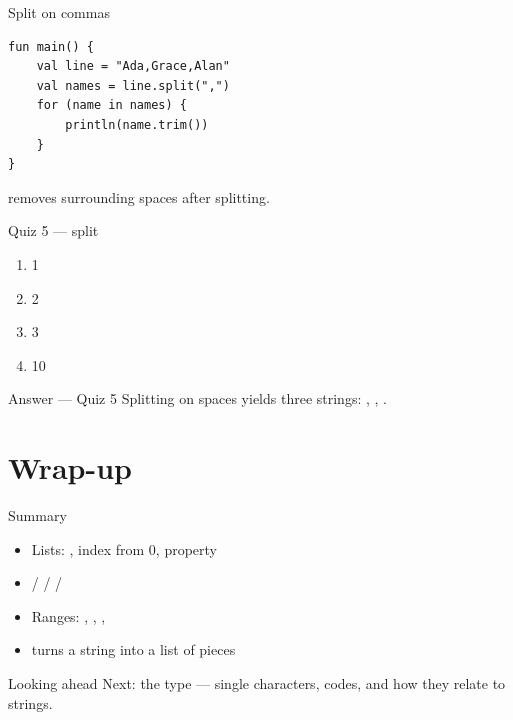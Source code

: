 \documentclass[aspectratio=169,11pt]{beamer}
\begin{document}
    \begin{frame}[fragile]{Split on commas}
        \begin{lstlisting}
fun main() {
    val line = "Ada,Grace,Alan"
    val names = line.split(",")
    for (name in names) {
        println(name.trim())
    }
}
        \end{lstlisting}
         removes surrounding spaces after splitting.
        \vspace{0.4em}
    \end{frame}

    \begin{frame}{Quiz 5 --- split}
        \begin{enumerate}
            \item 1
            \item 2
            \item 3
            \item 10
        \end{enumerate}
        \quizpause
    \end{frame}

    \begin{frame}{Answer --- Quiz 5}
        \vspace{0.4em}
        Splitting on spaces yields three strings: , ,
        .
    \end{frame}

    \section{Wrap-up}

    \begin{frame}{Summary}
        \begin{itemize}
            \item Lists: , index from $0$, property 
            \item {} /  /  / 
            \item Ranges: , , , 
            \item {} turns a string into a list of pieces
        \end{itemize}
    \end{frame}

    \begin{frame}{Looking ahead}
        Next: the  type --- single characters, codes, and how they
        relate to strings.
    \end{frame}
\end{document}
